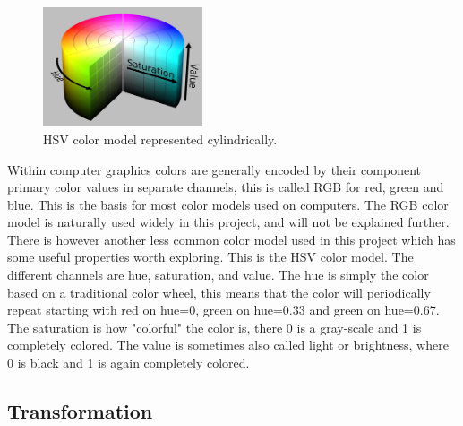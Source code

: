 
\begin{figure}
    \begin{center}
        \includegraphics[width=0.42\textwidth]{fig/hsv_illustration}
    \end{center}
    \caption{HSV color model represented cylindrically.}
\end{figure}

Within computer graphics colors are generally encoded by their component primary color values in separate channels, this is called RGB for red, green and blue. This is the basis for most color models used on computers. The RGB color model is naturally used widely in this project, and will not be explained further. There is however another less common color model used in this project which has some useful properties worth exploring. 
This is the HSV color model. The different channels are hue, saturation, and value. The hue is simply the color based on a traditional color wheel, this means that the color will periodically repeat starting with red on hue=0, green on hue=0.33 and green on hue=0.67. The saturation is how "colorful" the color is, there 0 is a gray-scale and 1 is completely colored. The value is sometimes also called light or brightness, where 0 is black and 1 is again completely colored.


\subsection*{Transformation}







